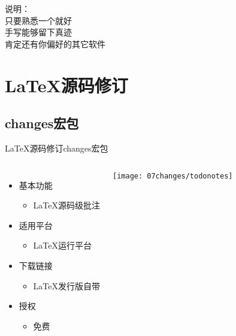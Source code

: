 \documentclass[fontset = none, t, aspectratio=169]{ctexbeamer}
\begin{document}
\begin{frame}
  说明：\\  
  只要\alert{熟悉一个}就好\\
  手写能够留下\alert{真迹}\\
  肯定还有你偏好的其它软件
\end{frame}

\section{\LaTeX 源码修订}
\subsection{changes宏包}

\begin{frame}[label=testframe]{\LaTeX 源码修订}{changes宏包}
    \begin{columns}[T]
    \begin{itemize}\itemsep=8pt
    \item 基本功能
      \begin{itemize}
      \item \LaTeX 源码级批注
      \end{itemize}
    \item 适用平台
      \begin{itemize}
      \item \LaTeX 运行平台
      \end{itemize}
    \item 下载链接
      \begin{itemize}
      \item \LaTeX 发行版自带
      \end{itemize}
    \item 授权
      \begin{itemize}
      \item \alert{免费}
      \end{itemize}
    \end{itemize}
    \texttt{[image: 07changes/todonotes]}
  \end{columns}
\end{frame}
\end{document}
